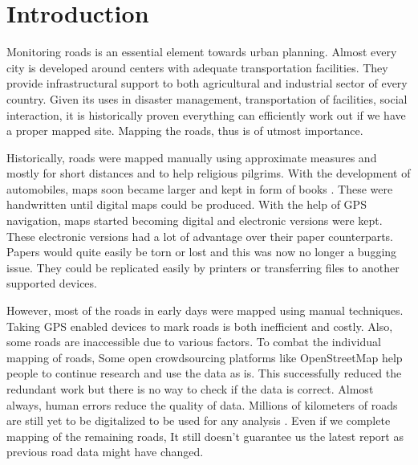 \chapter{Introduction}\label{chapt:intro}

Monitoring roads is an essential element towards urban planning. Almost every city is developed around centers with adequate transportation facilities. They provide infrastructural support to both agricultural and industrial sector of every country. Given its uses in disaster management, transportation of facilities, social interaction, it is historically proven everything can efficiently work out if we have a proper mapped site. Mapping the roads, thus is of utmost importance. \par

Historically, roads were mapped manually using approximate measures and mostly for short distances and to help religious pilgrims. With the development of automobiles, maps soon became larger and kept in form of books \cite{firstMapBooks}. These were handwritten until digital maps could be produced. With the help of GPS navigation, maps started becoming digital and electronic versions were kept. These electronic versions had a lot of advantage over their paper counterparts. Papers would quite easily be torn or lost and this was now no longer a bugging issue. They could be replicated easily by printers or transferring files to another supported devices. \par

However, most of the roads in early days were mapped using manual techniques. Taking GPS enabled devices to mark roads is both inefficient and costly. Also, some roads are inaccessible due to various factors. To combat the individual mapping of roads, Some open crowdsourcing platforms like OpenStreetMap help people to continue research and use the data as is. This successfully reduced the redundant work but there is no way to check if the data is correct. Almost always, human errors reduce the quality of data. Millions of kilometers of roads are still yet to be digitalized to be used for any analysis \cite{MapsDoneOSM}. Even if we complete mapping of the remaining roads, It still doesn't guarantee us the latest report as previous road data might have changed. \par

